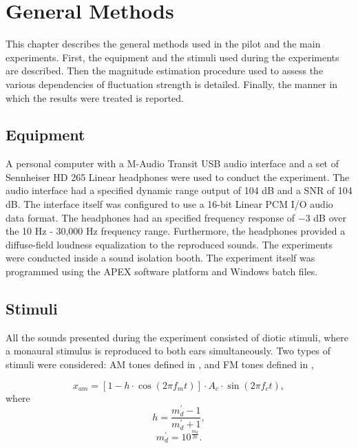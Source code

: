 \documentclass[../main.tex]{subfiles}
\begin{document}
\chapter{General Methods}
\label{cha:methods}

This chapter describes the general methods used in the pilot and the main
experiments. First, the equipment and the stimuli used during the experiments
are described. Then the magnitude estimation procedure used to assess the
various dependencies of fluctuation strength is detailed. Finally, the manner in
which the results were treated is reported.

\section{Equipment}

A personal computer with a M-Audio Transit USB audio interface
\cite{maudio:transitusb} and a set of Sennheiser HD 265 Linear headphones
\cite{sennheiser:hd265linear} were used to conduct the experiment. The audio
interface had a specified dynamic range output of 104 dB and a \gls{SNR} of 104
dB. The interface itself was configured to use a 16-bit Linear \gls{PCM}
\gls{I/O} audio data format. The headphones had an specified frequency response
of $-3$ dB over the 10 Hz - 30,000 Hz frequency range. Furthermore, the
headphones provided a diffuse-field loudness equalization to the reproduced
sounds. The experiments were conducted inside a sound isolation booth. The
experiment itself was programmed using the APEX software platform
\cite{Francart2008} and Windows batch files.

\section{Stimuli}
\label{sec:stimuli}

All the sounds presented during the experiment consisted of diotic stimuli,
where a monaural stimulus is reproduced to both ears simultaneously. Two types
of stimuli were considered: \gls{AM} tones defined in , and \gls{FM}
tones defined in ,

\begin{equation}
  x_{am} = [1 - h \cdot \cos(2 \pi f_m t)] \cdot A_c \cdot \sin(2 \pi f_c t),
  \label{eq:am}
\end{equation}
where
\begin{equation}
  h = \frac{m_d^{\prime}-1}{m_d^{\prime}+1},
\end{equation}
\begin{equation}
  m_d^{\prime} = 10^{\frac{m_d}{20}}.
\end{equation}
\end{document}
